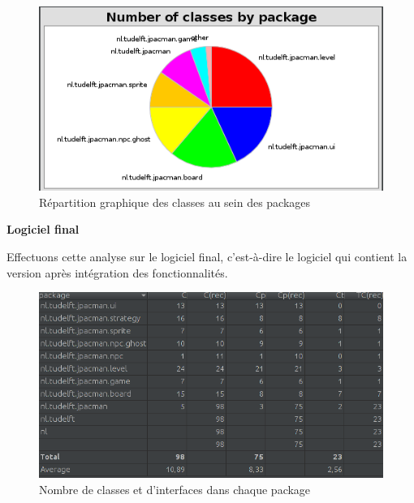 \documentclass[12pt, openany]{report}
\begin{document}
\begin{figure}[!h]
	\centering
	\includegraphics[scale=0.7]{Images/classMetrics2.png} 
	\caption{Répartition graphique des classes au sein des packages}
	\label{classMetrics2}
\end{figure}
\newpage
\textbf{Logiciel final}

Effectuons cette analyse sur le logiciel final, c'est-à-dire le logiciel qui contient la version après intégration des fonctionnalités.

\begin{figure}[!h]
	\centering
	\includegraphics[scale=0.6]{Images/classMetrics3.png} 
	\caption{Nombre de classes et d'interfaces dans chaque package}
	\label{classMetrics3}
\end{figure}
\end{document}
